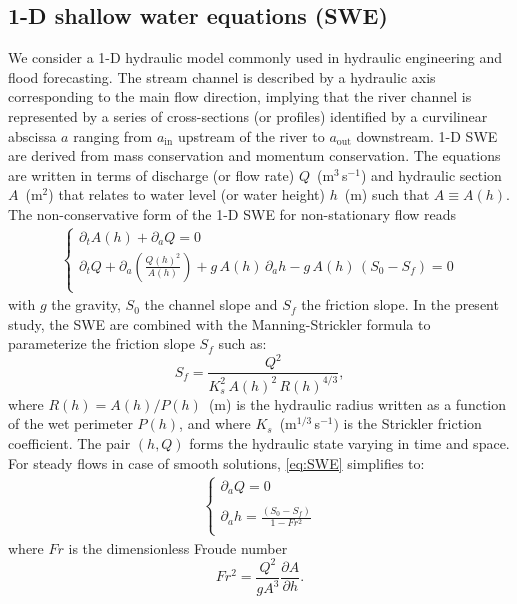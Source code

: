 \subsection{1-D shallow water equations (SWE)}

We consider a 1-D hydraulic model commonly used in hydraulic engineering and flood forecasting. The stream channel is described by a hydraulic axis corresponding to the main flow direction, implying that the river channel is represented by a series of cross-sections (or profiles) identified by a curvilinear abscissa $a$ ranging from $a_{\text{in}}$ upstream of the river to $a_{\text{out}}$ downstream. 1-D SWE are derived from mass conservation and momentum conservation. The equations are written in terms of discharge (or flow rate) $Q$~(m$^3$\,s$^{-1}$) and hydraulic section $A$~(m$^2$) that relates to water level (or water height) $h$~(m) such that $A \equiv A(h)$. The non-conservative form of the 1-D SWE for non-stationary flow reads~\citep{thual2010} 
\begin{eqnarray}
\left\{
\begin{array}{l}
\displaystyle{\partial_t A(h) + \partial_a Q=0} \\
\displaystyle{\partial_t Q +  \partial_a\left(\frac{Q(h)^2}{A(h)}\right) + g\,A(h)\,\partial_a h - g\,A(h)\,(S_0-S_f) = 0} \\
\end{array}
\right.
\label{eq:SWE}
\end{eqnarray}
with $g$ the gravity, $S_0$ the channel slope and $S_f$ the friction slope. In the present study, the SWE are combined with the Manning-Strickler formula to parameterize the friction slope $S_f$ such as:
\begin{equation}
S_f = \frac{Q^2}{K_s^2\,A(h)^{2}\,R(h)^{4/3}},   
\label{eq:friction}
\end{equation}
where $R(h) =A(h)/P(h)$~(m) is the hydraulic radius written as a function of the wet perimeter $P(h)$, and where $K_s$~(m$^{1/3}$\,s$^{-1})$ is the Strickler friction coefficient. The pair $(h,Q)$ forms the hydraulic state varying in time and space. For steady flows in case of smooth solutions, \cref{eq:SWE} simplifies to: 
\begin{eqnarray}
\left\{
\begin{array}{l}
\displaystyle{\partial_a Q=0} \\ \\
\displaystyle{\partial_a h =\frac{(S_0-S_f)}{1-Fr^ 2}}\\
\end{array}
\right.
\label{eq:backwater}
\end{eqnarray}
where $Fr$ is the dimensionless Froude number 
\begin{equation}
Fr^2 = \frac{Q^2}{gA^3} \frac{\partial{A}}{\partial{h}}.
\label{eq:froude}
\end{equation}

